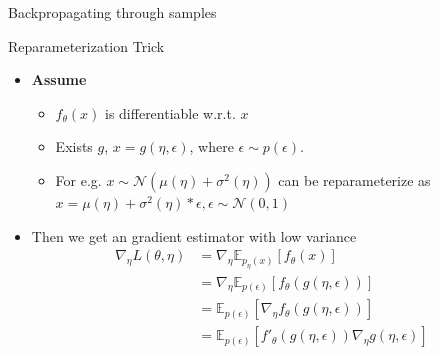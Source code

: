 \documentclass[compress]{beamer}
\newcommand{\expects}[2]{\mathbb{E}_{#1} \left[ #2 \right]}
\begin{document}
\begin{frame}[allowframebreaks]{Backpropagating through samples}
    \framebreak
    \begin{block}{Reparameterization Trick}
        \begin{itemize}
            \item \textbf{Assume} 
                \begin{itemize}
                    \item $f_\theta(x)$ is differentiable w.r.t. $x$
                    \item Exists $g$, $x=g(\eta, \epsilon)$, where $\epsilon \sim p(\epsilon)$. 
                    \item For e.g. $x\sim \mathcal{N}(\mu(\eta)+\sigma^2(\eta))$ can be reparameterize as $x=\mu(\eta)+\sigma^2(\eta)*\epsilon, \epsilon\sim \mathcal{N}(0,1)$
                \end{itemize}
            \item Then we get an gradient estimator with low variance 
                \begin{align*}
                    \nabla_\eta L(\theta, \eta) & = \nabla_\eta \expects{p_\eta(x)}{f_\theta(x)} \\
                                                & = \nabla_\eta \expects{p(\epsilon)}{f_\theta(g(\eta, \epsilon))} \\
                                                & = \expects{p(\epsilon)}{\nabla_\eta f_\theta(g(\eta, \epsilon))} \\
                                                & = \expects{p(\epsilon)}{f'_\theta(g(\eta, \epsilon))\nabla_\eta g(\eta, \epsilon)} \\
                \end{align*}
        \end{itemize}
        
    \end{block}

\end{frame}
\end{document}
